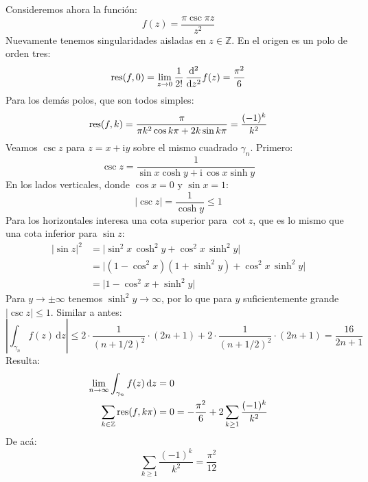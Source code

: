   Consideremos ahora la función:
  \begin{equation*}
    f(z)
      = \frac{\pi \csc \pi z}{z^2}
  \end{equation*}
  Nuevamente tenemos singularidades aisladas
  en \(z \in \mathbb{Z}\).
  En el origen es un polo de orden tres:
  \begin{equation*}
    \operatorname{res}(f, 0)
      = \lim_{z \rightarrow 0} \frac{1}{2!} \,
	  \frac{\mathrm{d}^2}{\mathrm{d} z^2} f(z)
      = \frac{\pi^2}{6}
  \end{equation*}
  Para los demás polos,
  que son todos simples:
  \begin{equation*}
    \operatorname{res}(f, k)
      = \frac{\pi}{\pi k^2 \cos k \pi + 2 k \sin k \pi}
      = \frac{(-1)^k}{k^2}
  \end{equation*}
  Veamos \(\csc z\) para \(z = x + \mathrm{i} y\)
  sobre el mismo cuadrado \(\gamma_n\).
  Primero:
  \begin{equation*}
    \csc z
      = \frac{1}{\sin x \cosh y + \mathrm{i} \, \cos x \sinh y}
  \end{equation*}
  En los lados verticales,
  donde \(\cos x = 0\) y \(\sin x = 1\):
  \begin{equation}
    \label{eq:complex-csc-vertical-bound}
    \lvert \csc z \rvert
      = \frac{1}{\cosh y}
      \le 1
  \end{equation}
  Para los horizontales interesa una cota superior para \(\cot z\),
  que es lo mismo que una cota inferior para \(\sin z\):
  \begin{align*}
    \lvert \sin z \rvert^2
      &= \lvert \sin^2 x \, \cosh^2 y
	    + \cos^2 x \, \sinh^2 y \rvert \\
      &= \lvert (1 - \cos^2 x) (1 + \sinh^2 y)
		   + \cos^2 x \, \sinh^2 y \rvert \\
      &= \lvert 1 - \cos^2 x + \sinh^2 y \rvert
  \end{align*}
  Para \(y \rightarrow \pm \infty\)
  tenemos \(\sinh^2 y \rightarrow \infty\),
  por lo que para \(y\) suficientemente grande
    \(\lvert \csc z \rvert \le 1\).
  Similar a antes:
  \begin{equation*}
    \left\lvert \int_{\gamma_n} f(z) \, \mathrm{d} z \right\rvert
      \le 2 \cdot \frac{1}{(n  + 1/2)^2} \cdot (2 n + 1)
	   + 2 \cdot \frac{1}{(n + 1/2)^2} \cdot (2 n + 1)
      = \frac{16}{2 n + 1}
  \end{equation*}
  Resulta:
  \begin{align*}
    \lim_{n \rightarrow \infty} \int_{\gamma_n} f(z) \, \mathrm{d} z
      &= 0 \\
    \sum_{k \in \mathbb{Z}} \operatorname{res}(f, k \pi)
      &= 0
       = - \frac{\pi^2}{6} + 2 \sum_{k \ge 1} \frac{(-1)^k}{k^2}
  \end{align*}
  De acá:
  \begin{equation}
    \label{eq:sum-alternating-reciprocal-squares}
    \sum_{k \ge 1} \frac{(-1)^k}{k^2}
      = \frac{\pi^2}{12}
  \end{equation}

